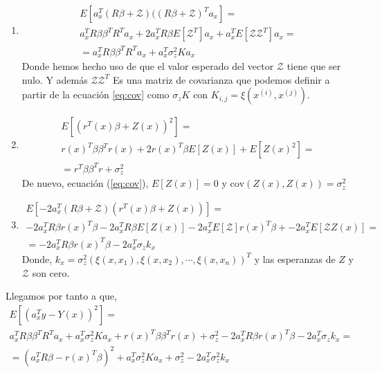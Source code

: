 \documentclass[10pt,a4paper]{report}
\begin{document}
\begin{enumerate}
\item \begin{equation}
\begin{split}
E[a_x^T(R\beta+\mathcal{Z})((R\beta+\mathcal{Z})^Ta_x] =\\
a_x^TR\beta\beta^TR^Ta_x +2a_x^TR\beta E[\mathcal{Z}^T]a_x + a_x^TE[\mathcal{Z}\mathcal{Z}^T]a_x=\\
=a_x^TR\beta\beta^TR^Ta_x +a_x^T\sigma_z^2Ka_x
\end{split}
\end{equation}
Donde hemos hecho uso de que el valor esperado del vector $\mathcal{Z}$ tiene que ser nulo. Y además $\mathcal{Z}\mathcal{Z}^T$ Es una matriz de covarianza que podemos definir a partir de la ecuación \ref{eq:cov} como $\sigma_zK$ con $K_{i,j} = \xi(x^{(i)},x^{(j)})$.  

\item \begin{equation}
\begin{split}
E[(r^T(x)\beta+Z(x))^2]=\\
r(x)^T\beta\beta^Tr(x) + 2r(x)^T\beta E[Z(x)] + E[Z(x)^2]=\\
= r^T\beta\beta^Tr + \sigma_z^2
\end{split}
\end{equation}
De nuevo, ecuación (\ref{eq:cov}),  $E[Z(x)] = 0$ y $\text{cov}(Z(x),Z(x)) = \sigma_z^2$

\item \begin{equation}
\begin{split}
E[-2a_x^T(R\beta + \mathcal{Z})(r^T(x)\beta +Z(x))]=\\
-2a_x^TR\beta r(x)^T\beta -2a_x^TR\beta E[Z(x)]-2a_x^TE[\mathcal{Z}]r(x)^T\beta + -2a_x^TE[\mathcal{Z}Z(x)]=\\
=-2a_x^TR\beta r(x)^T\beta -2a_x^T\sigma_zk_x
\end{split}
\end{equation}
Donde, $k_x = \sigma_z^2(\xi(x,x_1),\xi(x,x_2),\cdots,\xi(x,x_n))^T$ y las esperanzas de $Z$ y $\mathcal{Z}$ son cero.
\end{enumerate}
Llegamos por tanto a que,
\begin{equation}\label{eq:min}
\begin{split}
E[(a_x^Ty-Y(x))^2] =\\
a_x^TR\beta\beta^TR^Ta_x +a_x^T\sigma_z^2Ka_x+r(x)^T\beta\beta^Tr(x) + \sigma_z^2-2a_x^TR\beta r(x)^T\beta -2a_x^T\sigma_zk_x=\\
=(a_x^TR\beta-r(x)^T\beta)^2+a_x^T\sigma_z^2Ka_x+\sigma_z^2-2a_x^T\sigma_z^2 k_x
\end{split}
\end{equation}
\end{document}
